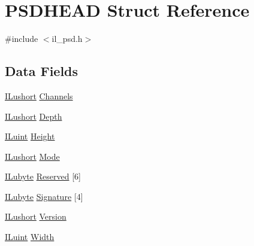 \hypertarget{struct_p_s_d_h_e_a_d}{\section{P\-S\-D\-H\-E\-A\-D Struct Reference}
\label{struct_p_s_d_h_e_a_d}
}


{\ttfamily \#include $<$il\-\_\-psd.\-h$>$}

\subsection*{Data Fields}
\begin{DoxyCompactItemize}
\item 
\hyperlink{il_8h_af6287b43748354a7c4864da43ae56962}{I\-Lushort} \hyperlink{struct_p_s_d_h_e_a_d_ab7bfe2be5a4b939391be4eb52603d02a}{Channels}
\item 
\hyperlink{il_8h_af6287b43748354a7c4864da43ae56962}{I\-Lushort} \hyperlink{struct_p_s_d_h_e_a_d_aae1f3fb764b6596264cb5a751c12b104}{Depth}
\item 
\hyperlink{il_8h_ac6508d0e9c19e32f32e00d54b5b8cf30}{I\-Luint} \hyperlink{struct_p_s_d_h_e_a_d_a8a8093d76b61a95fc96df24af29b107a}{Height}
\item 
\hyperlink{il_8h_af6287b43748354a7c4864da43ae56962}{I\-Lushort} \hyperlink{struct_p_s_d_h_e_a_d_ab7c7dae40a83da2046e3b9743455a0a8}{Mode}
\item 
\hyperlink{il_8h_a8d2f04500100a86d1b00e98ab1b15a33}{I\-Lubyte} \hyperlink{struct_p_s_d_h_e_a_d_add245d6c8bba36b4c3ef9015e97ec2f0}{Reserved} \mbox{[}6\mbox{]}
\item 
\hyperlink{il_8h_a8d2f04500100a86d1b00e98ab1b15a33}{I\-Lubyte} \hyperlink{struct_p_s_d_h_e_a_d_a5bac2a1102eda8a6453823b7be892818}{Signature} \mbox{[}4\mbox{]}
\item 
\hyperlink{il_8h_af6287b43748354a7c4864da43ae56962}{I\-Lushort} \hyperlink{struct_p_s_d_h_e_a_d_a3824b470c86baa88d6ac31a3719e9f9a}{Version}
\item 
\hyperlink{il_8h_ac6508d0e9c19e32f32e00d54b5b8cf30}{I\-Luint} \hyperlink{struct_p_s_d_h_e_a_d_a4146e7b2b0b4097e0e335f9b348392bf}{Width}
\end{DoxyCompactItemize}


